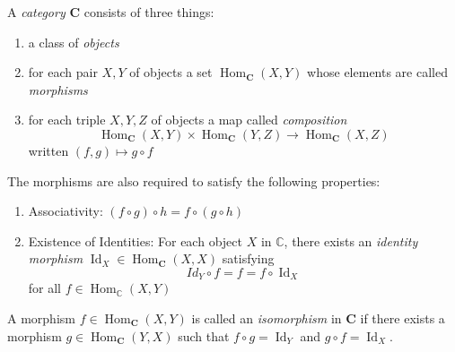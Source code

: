 \documentclass{article}
\DeclareMathOperator{\Id}{Id}
\DeclareMathOperator{\Hom}{Hom}
\newcounter{definition}[section]
\begin{document}
    \begin{definition}[Category]
      \label{def:category}
    A \textit{category} $\mathbf{C}$ consists of three things: 
    \begin{enumerate}
        \item a class of \textit{objects}
        \item for each pair $X, Y$ of objects a set $\Hom_\mathbf{C} (X, Y)$ whose elements are called \textit{morphisms}
        \item for each triple $X, Y, Z$ of objects a map called \textit{composition}
        \begin{equation}
          \Hom_\mathbf{C} (X, Y) \times \Hom_\mathbf{C} (Y, Z) \to \Hom_\mathbf{C} (X, Z)
        \end{equation}
        written $(f, g) \mapsto g \circ f$
    \end{enumerate}
    The morphisms are also required to satisfy the following properties: 
    \begin{enumerate}
        \item Associativity: $(f \circ g) \circ h = f \circ (g \circ h)$
        \item Existence of Identities: For each object $X$ in $\mathbb{C}$, there exists an \textit{identity morphism} $\Id_X \in \Hom_{\mathbf{C}}(X, X)$ satisfying 
        \begin{equation}
          Id_Y \circ f = f = f \circ \Id_X
        \end{equation}
        for all $f \in \Hom_\mathbb{C} (X, Y)$
    \end{enumerate}
    \end{definition}

    \begin{definition}
      \label{def:isomorphism-in-a-category}
    A morphism $f \in \Hom_\mathbf{C}(X, Y)$ is called an \textit{isomorphism} in $\mathbf{C}$ if there exists a morphism $g \in \Hom_\mathbf{C} (Y, X)$ such that $f \circ g = \Id_Y$ and $g \circ f = \Id_X$. 
    \end{definition}
\end{document}

